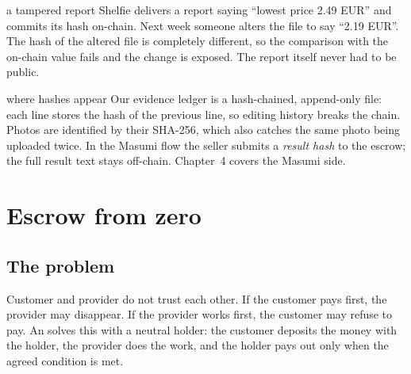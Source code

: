 \begin{center}
\end{center}

\begin{examplebox}{a tampered report}
Shelfie delivers a report saying ``lowest price 2.49 EUR'' and commits its hash  on-chain. Next week someone alters the file to say ``2.19 EUR''. The hash of the altered file is completely different, so the comparison with the on-chain value fails and the change is exposed. The report itself never had to be public.
\end{examplebox}

\begin{shelfiebox}{where hashes appear}
Our evidence ledger is a hash-chained, append-only file: each line stores the hash of the previous line, so editing history breaks the chain. Photos are identified by their SHA-256, which also catches the same photo being uploaded twice. In the Masumi flow the seller submits a \emph{result hash} to the escrow; the full result text stays off-chain. Chapter~4 covers the Masumi side.
\end{shelfiebox}

\section{Escrow from zero}
\subsection{The problem}
Customer and provider do not trust each other. If the customer pays first, the provider may disappear. If the provider works first, the customer may refuse to pay. An  solves this with a neutral holder: the customer deposits the money with the holder, the provider does the work, and the holder pays out only when the agreed condition is met.

